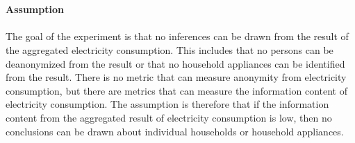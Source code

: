 \\
\\
\textbf{Assumption}
\\
\\
The goal of the experiment is that no inferences can be drawn from the result of the aggregated electricity consumption. This includes that no persons can be deanonymized from the result or that no household appliances can be identified from the result. There is no metric that can measure anonymity from electricity consumption, but there are metrics that can measure the information content of electricity consumption. The assumption is therefore that if the information content from the aggregated result of electricity consumption is low, then no conclusions can be drawn about individual households or household appliances.
\\
\\
